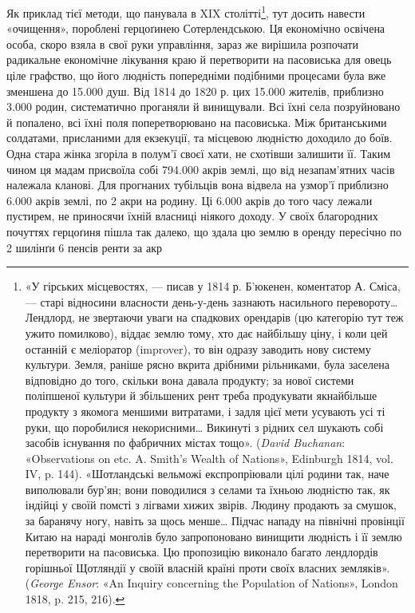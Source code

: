 Як приклад тієї методи, що панувала в XIX столітті\footnote{
«У гірських місцевостях, — писав у 1814 р. Б’юкенен, коментатор
А. Сміса, — старі відносини власности день-у-день зазнають насильного
перевороту\dots{} Лендлорд, не звертаючи уваги на спадкових орендарів
(цю категорію тут теж ужито помилково), віддає землю тому, хто дає найбільшу
ціну, і коли цей останній є меліоратор (improver), то він одразу заводить
нову систему культури. Земля, раніше рясно вкрита дрібними рільниками,
була заселена відповідно до того, скільки вона давала продукту;
за нової системи поліпшеної культури й збільшених рент треба продукувати
якнайбільше продукту з якомога меншими витратами, і задля цієї
мети усувають усі ті руки, що поробилися некорисними\dots{} Викинуті з
рідних сел шукають собі засобів існування по фабричних містах тощо».
(\emph{David Buchanan}: «Observations on etc. A. Smith’s Wealth of Nations»,
Edinburgh 1814, vol. IV, p. 144). «Шотландські вельможі експропріювали
цілі родини так, наче виполювали бур’ян; вони поводилися з селами
та їхньою людністю так, як індійці у своїй помсті з лігвами хижих звірів.
Людину продають за смушок, за баранячу ногу, навіть за щось
менше\dots{} Підчас нападу на північні провінції Китаю на нараді монголів
було запропоновано винищити людність і її землю перетворити на паcовиська.
Цю пропозицію виконало багато лендлордів горішньої Щотляндії
у своїй власній країні проти своїх власних земляків». (\emph{George
Ensor}: «An Inquiry concerning the Population of Nations», London 1818,
p. 215, 216).
}, тут досить
навести «очищення», пороблені герцоґинею Сотерлендською.
Ця економічно освічена особа, скоро взяла в свої руки управління,
зараз же вирішила розпочати радикальне економічне лікування
краю й перетворити на пасовиська для овець ціле графство,
що його людність попередніми подібними процесами була
вже зменшена до 15.000 душ. Від 1814 до 1820 р. цих 15.000 жителів,
приблизно 3.000 родин, систематично проганяли й винищували.
Всі їхні села позруйновано й попалено, всі їхні поля
поперетворювано на пасовиська. Між британськими солдатами,
присланими для екзекуції, та місцевою людністю доходило до
боїв. Одна стара жінка згоріла в полум’ї своєї хати, не схотівши
залишити її. Таким чином ця мадам присвоїла собі 794.000 акрів
землі, що від незапам’ятних часів належала кланові. Для прогнаних
тубільців вона відвела на узмор’ї приблизно 6.000 акрів
землі, по 2 акри на родину. Ці 6.000 акрів до того часу лежали
пустирем, не приносячи їхній власниці ніякого доходу. У своїх
благородних почуттях герцоґиня пішла так далеко, що здала
цю землю в оренду пересічно по 2 шилінґи 6 пенсів ренти за акр
